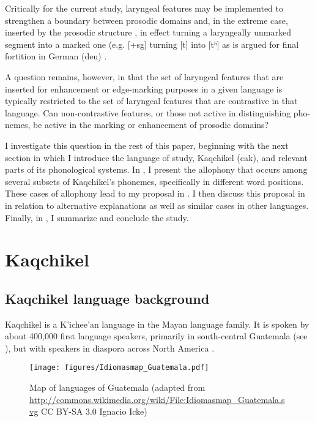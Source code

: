\documentclass[output=paper,colorlinks,citecolor=brown]{langscibook}
\begin{document}
Critically for the current study, laryngeal features may be implemented to strengthen a boundary between prosodic domains \citep{cho_2016} and, in the extreme case, inserted by the prosodic structure \citep{iosad_2016}, in effect turning a laryngeally unmarked segment into a marked one (e.g. [+sg] turning [t] into [tʰ] as is argued for final fortition in German (deu) \citep{iverson_salmons_2007}. 

A question remains, however, in that the set of laryngeal features that are inserted for enhancement or edge-marking purposes in a given language is typically restricted to the set of laryngeal features that are contrastive in that language. Can non-contrastive features, or those not active in distinguishing pho-nemes, be active in the marking or enhancement of prosodic domains?

I investigate this question in the rest of this paper, beginning with the next section in which I introduce the language of study, Kaqchikel (cak), and relevant parts of its phonological systems. In , I present the allophony that occurs among several subsets of Kaqchikel’s phonemes, specifically in different word positions. These cases of allophony lead to my proposal in . I then discuss this proposal in  in relation to alternative explanations as well as similar cases in other languages. Finally, in , I summarize and conclude the study.

\section{Kaqchikel}\label{Kaqchikel}
\subsection{Kaqchikel language background}\label{Kaqchikel language background}
Kaqchikel is a K’ichee’an language in the Mayan language family. It is spoken by about 400,000 first language speakers, primarily in south-central Guatemala (see ), but with speakers in diaspora across North America \citep{heaton_xoyón_2016}.

\begin{figure}
\texttt{[image: figures/Idiomasmap\_Guatemala.pdf]}
\caption{Map of languages of Guatemala \tiny (adapted from \url{http://commons.wikimedia.org/wiki/File:Idiomasmap_Guatemala.svg} CC BY-SA 3.0 Ignacio Icke)}
\label{map}
\end{figure}
\end{document}
